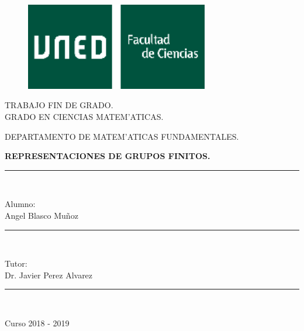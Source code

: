 \documentclass[a4paper,openright,12pt]{report}
\numberwithin{equation}{section} %
\begin{document}
\begin{titlepage}

\begin{center}
\vspace*{0.6in}
\begin{figure}[htb]
\begin{center}
\includegraphics[width=8cm]{./logo_uned.png}
\end{center}
\end{figure}

\begin{large}
TRABAJO FIN DE GRADO.\\
GRADO EN CIENCIAS MATEM'ATICAS.\\
\end{large}
\vspace*{0.15in}
DEPARTAMENTO DE MATEM'ATICAS FUNDAMENTALES. \\
\vspace*{0.4in}

\begin{Large}
\textbf{REPRESENTACIONES DE GRUPOS FINITOS.} \\
\end{Large}
\vspace*{0.3in}

\rule{80mm}{0.1mm}\\
\vspace*{0.1in}
\begin{large}
Alumno: \\
Angel Blasco Mu\~noz \\
\end{large}

\rule{80mm}{0.1mm}\\
\vspace*{0.1in}
\begin{large}
Tutor:\\
Dr. Javier Perez Alvarez\\
\end{large}
\rule{80mm}{0.1mm}\\

\end{center}
\vspace*{1in}
\begin{flushright}
Curso 2018 - 2019
\end{flushright}
\end{titlepage}
\newpage
$\ $
\thispagestyle{empty}
%
\end{document}
